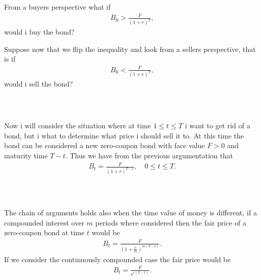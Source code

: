 \documentclass{beamer}
\numberwithin{equation}{section}
\begin{document}
\begin{frame}\frametitle{{\normalsize \secname} \\ {\large \subsecname}}
    From a buyers perspective what if
    \begin{align}\label{eq:zero_coupon_bond_example}
        B_0 > \frac{F}{(1 + r)^T},
    \end{align}
    would i buy the bond?
    \pause

    Suppose now that we flip the inequality and look from a sellers perspective, that is if
    \begin{align}\label{eq:zero_coupon_bond_example_seller}
        B_0 < \frac{F}{(1 + r)^T},
    \end{align}
    would i sell the bond?
\end{frame}

\begin{frame}\frametitle{{\normalsize \secname} \\ {\large \subsecname}}
    Now i will consider the situation where at time $1 \leq t \leq T$ i want to get rid of a bond, but i what to determine what price i should sell it to.
    At this time the bond can be considered a new zero-coupon bond with face value $F > 0$ and maturity time $T - t$.
    Thus we have from the previous argumentation that
    \begin{align}
        B_t = \frac{F}{(1 + r)^{T - t}}, \quad 0 \leq t \leq T.
    \end{align}
\end{frame}

\begin{frame}\frametitle{{\normalsize \secname} \\ {\large \subsecname}}
    The chain of arguments holds also when the time value of money is different, if a compounded interest over $m$ periods where considered then the fair price of a zero-coupon bond at time $t$ would be
    \begin{align}
        B_t = \frac{F}{\left(1 + \frac{r}{m}\right)^{m(T - t)}}.
    \end{align}
    If we consider the continuously compounded case the fair price would be
    \begin{align}
        B_t = \frac{F}{e^{r(T -t)}}.
    \end{align}
\end{frame}
\end{document}
